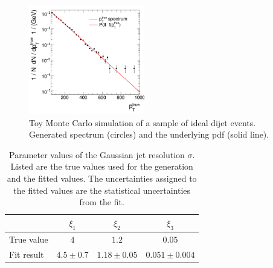 \begin{figure}[ht]
  \centering
  \includegraphics[width=0.45\textwidth]{figures/resFit_ToyMC_PtGenCuts_SpectrumLog}
  \caption{Toy Monte Carlo simulation of a sample of ideal dijet events.
    Generated \pttrue spectrum (circles) and the underlying pdf (solid line).}
  \label{fig:ResFit:App:ToyMC:Spectrum}
\end{figure}

\begin{table}[ht]
  \caption{Parameter values of the Gaussian jet \pt resolution $\sigma$.
    Listed are the true values used for the generation and the fitted values.
    The uncertainties assigned to the fitted values are the statistical uncertainties from the fit.}
  \centering
  \begin{tabular}[ht]{lccc}
    \toprule
     & $\xi_{1}$ & $\xi_{2}$ & $\xi_{3}$ \\
    \midrule
    True value & $4$           & $1.2$           & $0.05$ \\
    Fit result & $4.5 \pm 0.7$ & $1.18 \pm 0.05$ & $0.051 \pm 0.004$ \\
    \bottomrule
  \end{tabular}
  \label{tab:ResFit:ToyMC:FitResult}
\end{table}

